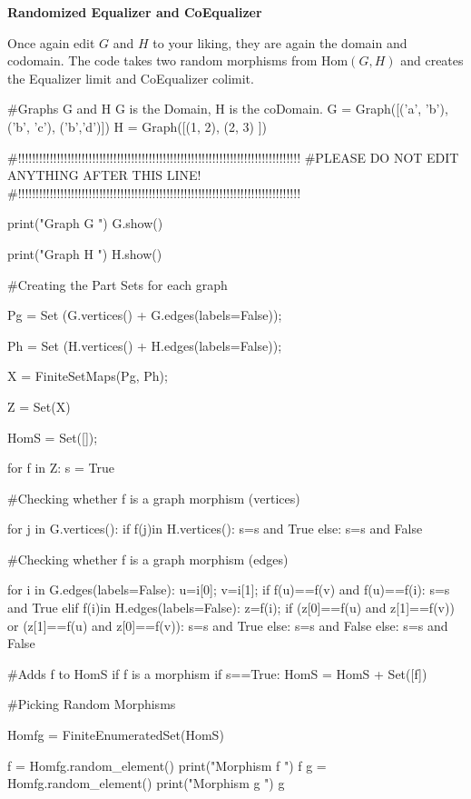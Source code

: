 \documentclass{ximera}
\begin{document}
\textbf{Randomized Equalizer and CoEqualizer}

Once again edit $G$ and $H$ to your liking, they are again the domain and codomain.  The code takes two random morphisms from Hom$(G, H)$ and creates the Equalizer limit and CoEqualizer colimit.


\begin{sageCell}
#Graphs G and H  G is the Domain, H is the coDomain.
G = Graph([('a', 'b'),('b', 'c'), ('b','d')])
H = Graph([(1, 2), (2, 3) ])

#!!!!!!!!!!!!!!!!!!!!!!!!!!!!!!!!!!!!!!!!!!!!!!!!!!!!!!!!!!!!!!!!!!!!!!!!!!!!!!!!
#PLEASE DO NOT EDIT ANYTHING AFTER THIS LINE!
#!!!!!!!!!!!!!!!!!!!!!!!!!!!!!!!!!!!!!!!!!!!!!!!!!!!!!!!!!!!!!!!!!!!!!!!!!!!!!!!!

print("\n\n Graph G \n")
G.show()



print("\n\n Graph H \n\n")
H.show()

#Creating the Part Sets for each graph


Pg = Set (G.vertices() + G.edges(labels=False)); 


Ph = Set (H.vertices() + H.edges(labels=False)); 

X = FiniteSetMaps(Pg, Ph); 

Z = Set(X)

HomS = Set([]); 

for f in Z:
    s = True

#Checking whether f is a graph morphism (vertices)

    for j in G.vertices():
        if f(j)in H.vertices():
            s=s and True
        else:
            s=s and False


#Checking whether f is a graph morphism (edges)

    for i in G.edges(labels=False):
        u=i[0];
        v=i[1];
        if f(u)==f(v) and f(u)==f(i):
            s=s and True
        elif f(i)in H.edges(labels=False):
            z=f(i);
            if (z[0]==f(u) and z[1]==f(v)) or (z[1]==f(u) and z[0]==f(v)):
                s=s and True
            else:
                s=s and False
        else: s=s and False

#Adds f to HomS if f is a morphism
    if s==True:
        HomS = HomS + Set([f])

#Picking Random Morphisms

Homfg = FiniteEnumeratedSet(HomS)

f = Homfg.random_element()
print("\n\n Morphism f \n\n")
f
g = Homfg.random_element()
print("\n\n Morphism g \n\n")
g






\end{sageCell}
\end{document}
